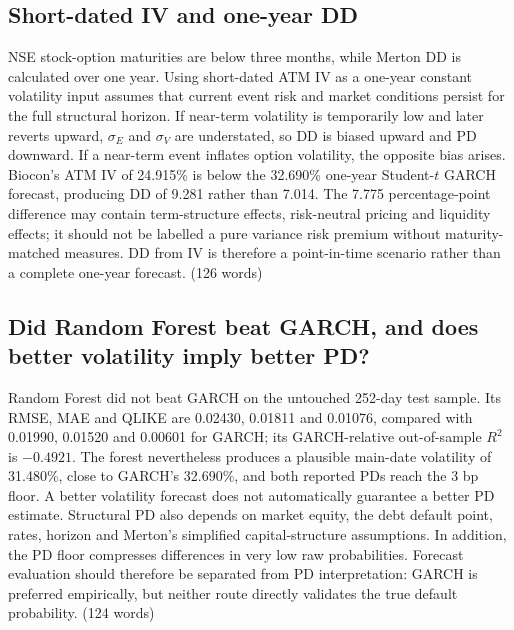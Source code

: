 \documentclass[10pt,a4paper]{article}
\newcommand{\sigE}{\sigma_E}
\newcommand{\sigV}{\sigma_V}
\begin{document}
\subsection{Short-dated IV and one-year DD}
NSE stock-option maturities are below three months, while Merton DD is calculated over one year. Using short-dated ATM IV as a one-year constant volatility input assumes that current event risk and market conditions persist for the full structural horizon. If near-term volatility is temporarily low and later reverts upward, $\sigE$ and $\sigV$ are understated, so DD is biased upward and PD downward. If a near-term event inflates option volatility, the opposite bias arises. Biocon's ATM IV of 24.915\% is below the 32.690\% one-year Student-$t$ GARCH forecast, producing DD of 9.281 rather than 7.014. The 7.775 percentage-point difference may contain term-structure effects, risk-neutral pricing and liquidity effects; it should not be labelled a pure variance risk premium without maturity-matched measures. DD from IV is therefore a point-in-time scenario rather than a complete one-year forecast. (126 words)

\subsection{Did Random Forest beat GARCH, and does better volatility imply better PD?}
Random Forest did not beat GARCH on the untouched 252-day test sample. Its RMSE, MAE and QLIKE are 0.02430, 0.01811 and 0.01076, compared with 0.01990, 0.01520 and 0.00601 for GARCH; its GARCH-relative out-of-sample $R^2$ is $-0.4921$. The forest nevertheless produces a plausible main-date volatility of 31.480\%, close to GARCH's 32.690\%, and both reported PDs reach the 3 bp floor. A better volatility forecast does not automatically guarantee a better PD estimate. Structural PD also depends on market equity, the debt default point, rates, horizon and Merton's simplified capital-structure assumptions. In addition, the PD floor compresses differences in very low raw probabilities. Forecast evaluation should therefore be separated from PD interpretation: GARCH is preferred empirically, but neither route directly validates the true default probability. (124 words)
\end{document}
